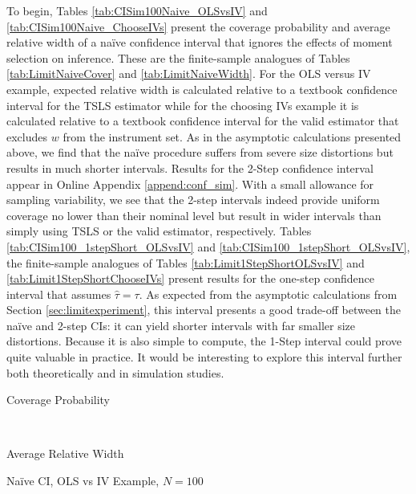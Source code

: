 To begin, Tables \ref{tab:CISim100Naive_OLSvsIV} and \ref{tab:CISim100Naive_ChooseIVs} present the coverage probability and average relative width of a na\"{i}ve confidence interval that ignores the effects of moment selection on inference.
These are the finite-sample analogues of Tables \ref{tab:LimitNaiveCover} and \ref{tab:LimitNaiveWidth}.
For the OLS versus IV example, expected relative width is calculated relative to a textbook confidence interval for the TSLS estimator while for the choosing IVs example it is calculated relative to a textbook confidence interval for the valid estimator that excludes $w$ from the instrument set. 
As in the asymptotic calculations presented above, we find that the na\"{i}ve procedure suffers from severe size distortions but results in much shorter intervals.
Results for the 2-Step confidence interval appear in Online Appendix \ref{append:conf_sim}.
With a small allowance for sampling variability, we see that the 2-step intervals indeed provide uniform coverage no lower than their nominal level but result in wider intervals than simply using TSLS or the valid estimator, respectively.
Tables \ref{tab:CISim100_1stepShort_OLSvsIV} and \ref{tab:CISim100_1stepShort_OLSvsIV}, the finite-sample analogues of Tables \ref{tab:Limit1StepShortOLSvsIV} and \ref{tab:Limit1StepShortChooseIVs} present results for the one-step confidence interval that assumes $\widehat{\tau} = \tau$.
As expected from the asymptotic calculations from Section \ref{sec:limitexperiment}, this interval presents a good trade-off between the na\"{i}ve and 2-step CIs: it can yield shorter intervals with far smaller size distortions.
Because it is also simple to compute, the 1-Step interval could prove quite valuable in practice.
It would be interesting to explore this interval further both theoretically and in simulation studies.




\begin{table}[h]
  \footnotesize
  \centering
  \begin{subtable}{0.48\textwidth}
    \caption{Coverage Probability}
    
  \end{subtable}
  ~
  \begin{subtable}{0.48\textwidth}
    \caption{Average Relative Width}
    
  \end{subtable}
  \caption{Na\"{i}ve CI, OLS vs IV Example, $N=100$}
  \label{tab:CISim100Naive_OLSvsIV}
\end{table}



